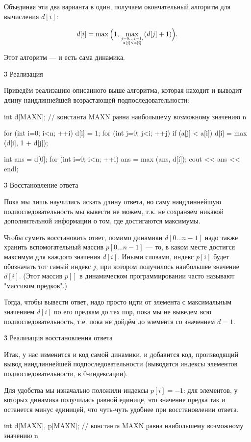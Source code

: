 Объединяя эти два варианта в один, получаем окончательный алгоритм для вычисления $d[i]$:

$$ d[i] = \max \Big( 1, \max_{j=0 \ldots i-1, \atop a[j] < a[i]} ( d[j] + 1 ) \Big). $$

Этот алгоритм --- и есть сама динамика.


\h3{ Реализация }

Приведём реализацию описанного выше алгоритма, которая находит и выводит длину наидлиннейшей возрастающей подпоследовательности:

\code
int d[MAXN]; // константа MAXN равна наибольшему возможному значению n

for (int i=0; i<n; ++i) {
	d[i] = 1;
	for (int j=0; j<i; ++j)
		if (a[j] < a[i])
			d[i] = max (d[i], 1 + d[j]);
}

int ans = d[0];
for (int i=0; i<n; ++i)
	ans = max (ans, d[i]);
cout << ans << endl;
\endcode


\h3{ Восстановление ответа }

Пока мы лишь научились искать длину ответа, но саму наидлиннейшую подпоследовательность мы вывести не можем, т.к. не сохраняем никакой дополнительной информации о том, где достигаются максимумы.

Чтобы суметь восстановить ответ, помимо динамики $d[0 \ldots n-1]$ надо также хранить вспомогательный массив $p[0 \ldots n-1]$ --- то, в каком месте достигся максимум для каждого значения $d[i]$. Иными словами, индекс $p[i]$ будет обозначать тот самый индекс $j$, при котором получилось наибольшее значение $d[i]$. (Этот массив $p[]$ в динамическом программировании часто называют "массивом предков".)

Тогда, чтобы вывести ответ, надо просто идти от элемента с максимальным значением $d[i]$ по его предкам до тех пор, пока мы не выведем всю подпоследовательность, т.е. пока не дойдём до элемента со значением $d = 1$.


\h3{ Реализация восстановления ответа }

Итак, у нас изменится и код самой динамики, и добавится код, производящий вывод наидлиннейшей подпоследовательности (выводятся индексы элементов подпоследовательности, в 0-индексации).

Для удобства мы изначально положили индексы $p[i] = -1$: для элементов, у которых динамика получилась равной единице, это значение предка так и останется минус единицей, что чуть-чуть удобнее при восстановлении ответа.

\code
int d[MAXN], p[MAXN]; // константа MAXN равна наибольшему возможному значению n

